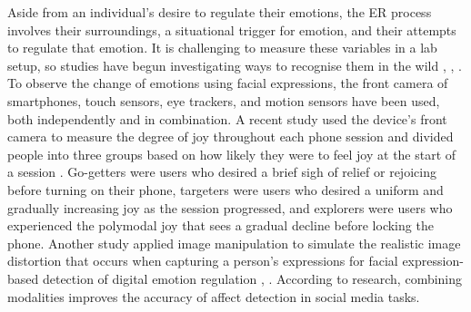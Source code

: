 Aside from an individual's desire to regulate their emotions, the ER process involves their surroundings, a situational trigger for emotion, and their attempts to regulate that emotion. It is challenging to measure these variables in a lab setup, so studies have begun investigating ways to recognise them in the wild \cite{wadley2019use}, \cite{smith2022digital}, \cite{martin2021music}. To observe the change of emotions using facial expressions, the front camera of smartphones, touch sensors, eye trackers, and motion sensors have been used, both independently and in combination. A recent study used the device's front camera to measure the degree of joy throughout each phone session and divided people into three groups based on how likely they were to feel joy at the start of a session \cite{tag2022emotion}. Go-getters were users who desired a brief sigh of relief or rejoicing before turning on their phone, targeters were users who desired a uniform and gradually increasing joy as the session progressed, and explorers were users who experienced the polymodal joy that sees a gradual decline before locking the phone. Another study applied image manipulation to simulate the realistic image distortion that occurs when capturing a person's expressions for facial expression-based detection of digital emotion regulation \cite{yang2021benchmarking}, \cite{ruensuk2020you}. According to research, combining modalities improves the accuracy of affect detection in social media tasks.

